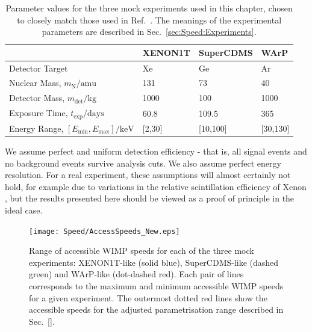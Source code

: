\begin{table}[t]
  \begin{center}
    \begin{tabular}{lm{2cm}m{2.1cm}m{1.7cm}}
    \hline\hline
    & XENON1T \cite{Aprile:2009a} & SuperCDMS \cite{Bruch:2010} & WArP \cite{Szelc:2009} \\
\hline
Detector Target & Xe & Ge & Ar \\
Nuclear Mass, \(m_\textrm{N} / \textrm{amu}\) & 131 & 73 & 40 \\
Detector Mass, \(m_\textrm{det} / \textrm{kg} \) & 1000  & 100 & 1000 \\
Exposure Time, \(t_\textrm{exp} / \textrm{days} \) & 60.8  & 109.5 & 365\\
Energy Range, \(\left[E_\textrm{min},E_\textrm{max} \right] / \textrm{keV}\) & [2,30] & [10,100] & [30,130] \\
    \hline\hline
    \end{tabular}
  \end{center}
  \caption[Parameter values for the three mock experiments used in Chapter \ref{ch:Speed}]{Parameter values for the three mock experiments used in this chapter, chosen to closely match those used in Ref.\ \cite{Peter:2011}. The meanings of the experimental parameters are described in Sec.\ \ref{sec:Speed:Experiments}.}
\label{tab:Speed:Expts}
\end{table}
We assume perfect and uniform detection efficiency - that is, all signal events and no background events survive analysis cuts. We also assume perfect energy resolution. For a real experiment, these assumptions will almost certainly not hold, for example due to variations in the relative scintillation efficiency of Xenon \cite{Aprile:2009b}, but the results presented here should be viewed as a proof of principle in the ideal case.

\begin{figure}[t]
  \centering
  \texttt{[image: Speed/AccessSpeeds\_New.eps]}
\caption[Range of accessible WIMP speeds for mock direct detection experiments]{Range of accessible WIMP speeds for each of the three mock experiments: XENON1T-like (solid blue), SuperCDMS-like (dashed green) and WArP-like (dot-dashed red). Each pair of lines corresponds to the maximum and minimum accessible WIMP speeds for a given experiment. The outermost dotted red lines show the accessible speeds for the adjusted parametrisation range described in Sec.\ \ref{}.}
  \label{fig:Speed:Access}
\end{figure}

